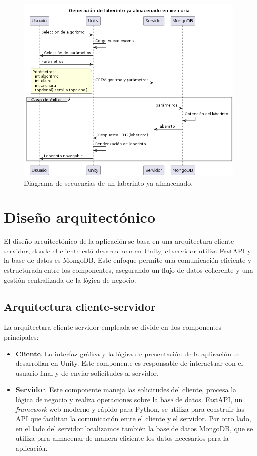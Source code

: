 \begin{figure}[H]
    \centering  
    \includegraphics[width=\textwidth]{img/LaberintoYaAlmacenado.png}  
    \caption{Diagrama de secuencias de un laberinto ya almacenado.}  
    \label{fig:LaberintoAlmacenado}
\end{figure}



\section{Diseño arquitectónico}

El diseño arquitectónico de la aplicación se basa en una arquitectura cliente-servidor, donde el cliente está desarrollado en Unity, el servidor utiliza FastAPI y la base de datos es MongoDB. Este enfoque permite una comunicación eficiente y estructurada entre los componentes, asegurando un flujo de datos coherente y una gestión centralizada de la lógica de negocio. 

\subsection{Arquitectura cliente-servidor}

La arquitectura cliente-servidor empleada se divide en dos componentes principales:

\begin{itemize}
    \item \textbf{Cliente}. La interfaz gráfica y la lógica de presentación de la aplicación se desarrollan en Unity. Este componente es responsable de interactuar con el usuario final y de enviar solicitudes al servidor.
    \item \textbf{Servidor}. Este componente maneja las solicitudes del cliente, procesa la lógica de negocio y realiza operaciones sobre la base de datos. FastAPI, un \textit{framework} web moderno y rápido para Python, se utiliza para construir las API que facilitan la comunicación entre el cliente y el servidor. Por otro lado, en el lado del servidor localizamos también la base de datos MongoDB, que se utiliza para almacenar de manera eficiente los datos necesarios para la aplicación.
\end{itemize}

